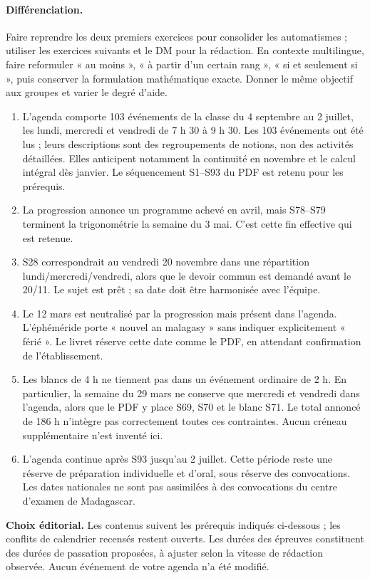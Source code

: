 \paragraph{Différenciation.} Faire reprendre les deux premiers exercices pour consolider les automatismes ; utiliser les exercices suivants et le DM pour la rédaction. En contexte multilingue, faire reformuler « au moins », « à partir d'un certain rang », « si et seulement si », puis conserver la formulation mathématique exacte. Donner le même objectif aux groupes et varier le degré d'aide.
\begin{enumerate}
\item L'agenda comporte 103 événements de la classe du 4 septembre au 2 juillet, les lundi, mercredi et vendredi de 7 h 30 à 9 h 30. Les 103 événements ont été lus ; leurs descriptions sont des regroupements de notions, non des activités détaillées. Elles anticipent notamment la continuité en novembre et le calcul intégral dès janvier. Le séquencement S1--S93 du PDF est retenu pour les prérequis.
\item La progression annonce un programme achevé en avril, mais S78--S79 terminent la trigonométrie la semaine du 3 mai. C'est cette fin effective qui est retenue.
\item S28 correspondrait au vendredi 20 novembre dans une répartition lundi/mercredi/vendredi, alors que le devoir commun est demandé avant le 20/11. Le sujet est prêt ; sa date doit être harmonisée avec l'équipe.
\item Le 12 mars est neutralisé par la progression mais présent dans l'agenda. L'éphéméride porte « nouvel an malagasy » sans indiquer explicitement « férié ». Le livret réserve cette date comme le PDF, en attendant confirmation de l'établissement.
\item Les blancs de 4 h ne tiennent pas dans un événement ordinaire de 2 h. En particulier, la semaine du 29 mars ne conserve que mercredi et vendredi dans l'agenda, alors que le PDF y place S69, S70 et le blanc S71. Le total annoncé de 186 h n'intègre pas correctement toutes ces contraintes. Aucun créneau supplémentaire n'est inventé ici.
\item L'agenda continue après S93 jusqu'au 2 juillet. Cette période reste une réserve de préparation individuelle et d'oral, sous réserve des convocations. Les dates nationales ne sont pas assimilées à des convocations du centre d'examen de Madagascar.
\end{enumerate}
\textbf{Choix éditorial.} Les contenus suivent les prérequis indiqués ci-dessous ; les conflits de calendrier recensés restent ouverts. Les durées des épreuves constituent des durées de passation proposées, à ajuster selon la vitesse de rédaction observée. Aucun événement de votre agenda n'a été modifié.
\fi
\tableofcontents
\mxnewpage
